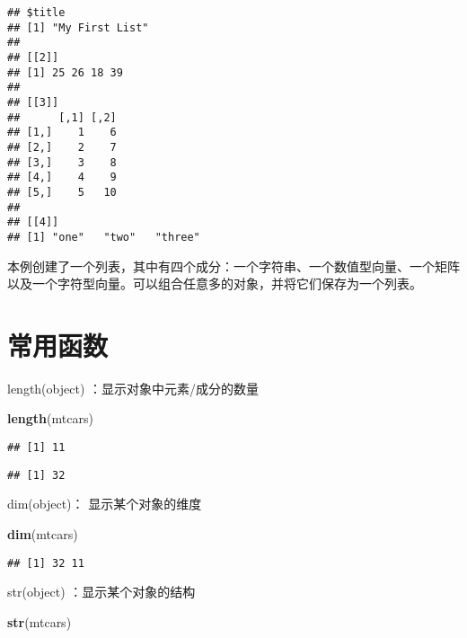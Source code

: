\documentclass[]{book}
\newenvironment{Shaded}{\begin{snugshade}}{\end{snugshade}}
\newcommand{\KeywordTok}[1]{\textcolor[rgb]{0.13,0.29,0.53}{\textbf{#1}}}
\newcommand{\NormalTok}[1]{#1}
\newcommand{\OperatorTok}[1]{\textcolor[rgb]{0.81,0.36,0.00}{\textbf{#1}}}
\begin{document}
\begin{verbatim}
## $title
## [1] "My First List"
## 
## [[2]]
## [1] 25 26 18 39
## 
## [[3]]
##      [,1] [,2]
## [1,]    1    6
## [2,]    2    7
## [3,]    3    8
## [4,]    4    9
## [5,]    5   10
## 
## [[4]]
## [1] "one"   "two"   "three"
\end{verbatim}

本例创建了一个列表，其中有四个成分：一个字符串、一个数值型向量、一个矩阵以及一个字符型向量。可以组合任意多的对象，并将它们保存为一个列表。

\section{常用函数}

length(object) ：显示对象中元素/成分的数量

\begin{Shaded}
\begin{Highlighting}[]
\KeywordTok{length}\NormalTok{(mtcars)}
\end{Highlighting}
\end{Shaded}

\begin{verbatim}
## [1] 11
\end{verbatim}

\begin{Shaded}
\end{Shaded}

\begin{verbatim}
## [1] 32
\end{verbatim}

dim(object)： 显示某个对象的维度

\begin{Shaded}
\begin{Highlighting}[]
\KeywordTok{dim}\NormalTok{(mtcars)}
\end{Highlighting}
\end{Shaded}

\begin{verbatim}
## [1] 32 11
\end{verbatim}

str(object) ：显示某个对象的结构

\begin{Shaded}
\begin{Highlighting}[]
\KeywordTok{str}\NormalTok{(mtcars)}
\end{Highlighting}
\end{Shaded}
\end{document}
